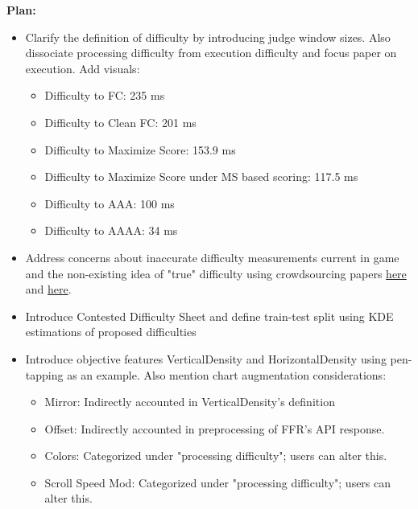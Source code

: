 \textbf{Plan:}
\begin{itemize}
	      	      
	\item Clarify the definition of difficulty by introducing judge window sizes. Also dissociate processing difficulty from execution difficulty and focus paper on execution. Add visuals:
	      \begin{itemize}
	      	\item Difficulty to FC: 235 ms
	      	\item Difficulty to Clean FC: 201 ms
	      	\item Difficulty to Maximize Score: 153.9 ms
	      	\item Difficulty to Maximize Score under MS based scoring: 117.5 ms
	      	\item Difficulty to AAA: 100 ms
	      	\item Difficulty to AAAA: 34 ms
	      \end{itemize}
	\item Address concerns about inaccurate difficulty measurements current in game and the non-existing idea of "true" difficulty using crowdsourcing papers \href{https://crowdsourcing-class.org/readings/downloads/quality-control/Quality-Management-on-Amazon-Mechanical-Turk.pdf#page4}{here} and \href{https://crowdsourcing-class.org/readings/downloads/ml/EM.pdf}{here}.
	      	      
	      \item{Introduce Contested Difficulty Sheet and define train-test split using KDE estimations of proposed difficulties}
	      	      
	      \item{Introduce objective features VerticalDensity and HorizontalDensity using pen-tapping as an example. Also mention chart augmentation considerations:}
	      \begin{itemize}
	      	\item Mirror: Indirectly accounted in VerticalDensity's definition
	      	\item Offset: Indirectly accounted in preprocessing of FFR's API response.
	      	\item Colors: Categorized under "processing difficulty"; users can alter this.
	      	\item Scroll Speed Mod: Categorized under "processing difficulty"; users can alter this.
	      \end{itemize}
	      	      

\end{itemize}
